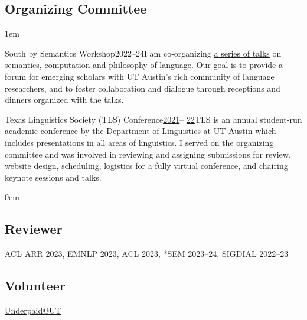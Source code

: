 \subsection{Organizing Committee}

\leftskip1em\relax

\smallentry
  {\large South by Semantics Workshop}{2022--24}{I am co-organizing \href{https://sites.utexas.edu/sxsemantics/}{a series of talks} on semantics, computation and philosophy of language. Our goal is to provide a forum for emerging scholars with UT Austin's rich community of language researchers, and to foster collaboration and dialogue through receptions and dinners organized with the talks.}
  
\smallentry
    {\large Texas Linguistics Society (TLS) Conference}{\href{http://tls.ling.utexas.edu/2021/}{2021}-- \href{http://tls.ling.utexas.edu/2022/}{22}}{TLS is an annual student-run academic conference by the Department of Linguistics at UT Austin which includes presentations in all areas of linguistics. I served on the organizing committee and was involved in reviewing and assigning submissions for review, website design, scheduling, logistics for a fully virtual conference, and chairing keynote sessions and talks.}

\leftskip0em\relax

\subsection{Reviewer}

\quad ACL ARR 2023, EMNLP 2023, ACL 2023, *SEM 2023--24, SIGDIAL 2022--23

\subsection{Volunteer}

\quad \href{http://underpaidatut.org}{Underpaid\makeatletter @\makeatother UT}
